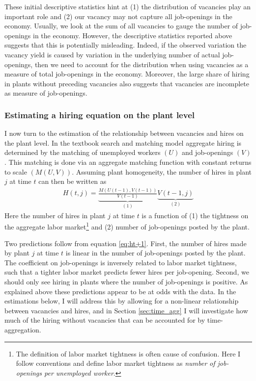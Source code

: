 These initial descriptive statistics hint at (1) the distribution of vacancies play an important role and (2) our vacancy may not capture all job-openings in the economy. Usually, we look at the sum of all vacancies to gauge the number of job-openings in the economy. However, the descriptive statistics reported above suggests that this is potentially misleading. Indeed, if the observed variation the vacancy yield is caused by variation in the underlying number of actual job-openings, then we need to account for the distribution when using vacancies as a measure of total job-openings in the economy. Moreover, the large share of hiring in plants without preceding vacancies also suggests that vacancies are incomplete as measure of job-openings.

\subsubsection{Estimating a hiring equation on the plant level}

I now turn to the estimation of the relationship between vacancies and hires on the plant level. In the textbook search and matching model aggregate hiring is determined by the matching of unemployed workers $(U)$ and job-openings $(V)$. This matching is done via an aggregate matching function with constant returns to scale $(M(U,V))$. Assuming plant homogeneity, the number of hires in plant $j$ at time $t$ can then be written as 
\begin{align}
H(t, j)=\underbrace{\frac{M(U(t-1),V(t-1))}{V(t-1)}}_{(1)} \underbrace{V(t-1,j)}_{(2)}
\label{eq:ht+1}
\end{align}
Here the number of hires in plant $j$ at time $t$ is a function of (1) the tightness on the aggregate labor market\footnote{The definition of labor market tightness is often cause of confusion. Here I follow conventions and define labor market tightness as \emph{number of job-openings per unemployed worker}.} and (2) number of job-openings posted by the plant.

Two predictions follow from equation \eqref{eq:ht+1}. First, the number of hires made by plant $j$ at time $t$ is linear in the number of job-openings posted by the plant. The coefficient on job-openings is inversely related to labor market tightness, such that a tighter labor market predicts fewer hires per job-opening. Second, we should only see hiring in plants where the number of job-openings is positive. As explained above these predictions appear to be at odds with the data. In the estimations below, I will address this by allowing for a non-linear relationship between vacancies and hires, and in Section \ref{sec:time_agg} I will investigate how much of the hiring without vacancies that can be accounted for by time-aggregation. 

